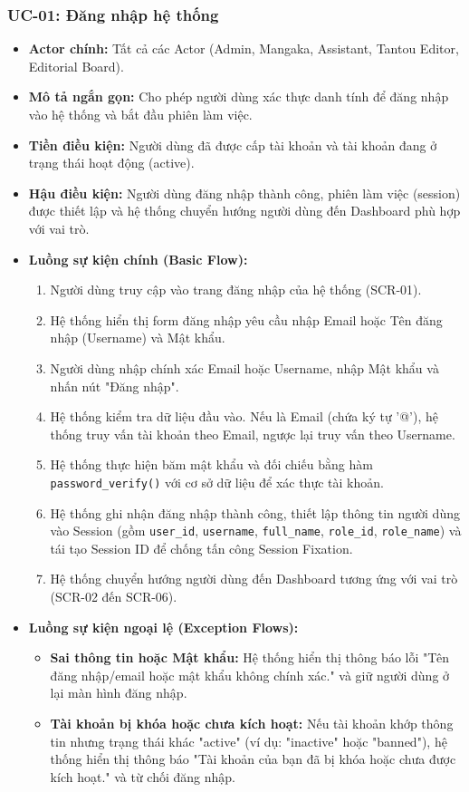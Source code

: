 \subsubsection{UC-01: Đăng nhập hệ thống}
\label{subsubsec:uc01_login}
\begin{itemize}
    \item \textbf{Actor chính:} Tất cả các Actor (Admin, Mangaka, Assistant, Tantou Editor, Editorial Board).
    \item \textbf{Mô tả ngắn gọn:} Cho phép người dùng xác thực danh tính để đăng nhập vào hệ thống và bắt đầu phiên làm việc.
    \item \textbf{Tiền điều kiện:} Người dùng đã được cấp tài khoản và tài khoản đang ở trạng thái hoạt động (active).
    \item \textbf{Hậu điều kiện:} Người dùng đăng nhập thành công, phiên làm việc (session) được thiết lập và hệ thống chuyển hướng người dùng đến Dashboard phù hợp với vai trò.
    \item \textbf{Luồng sự kiện chính (Basic Flow):}
        \begin{enumerate}
            \item Người dùng truy cập vào trang đăng nhập của hệ thống (SCR-01).
            \item Hệ thống hiển thị form đăng nhập yêu cầu nhập Email hoặc Tên đăng nhập (Username) và Mật khẩu.
            \item Người dùng nhập chính xác Email hoặc Username, nhập Mật khẩu và nhấn nút "Đăng nhập".
            \item Hệ thống kiểm tra dữ liệu đầu vào. Nếu là Email (chứa ký tự '@'), hệ thống truy vấn tài khoản theo Email, ngược lại truy vấn theo Username.
            \item Hệ thống thực hiện băm mật khẩu và đối chiếu bằng hàm \texttt{password\_\allowbreak verify()} với cơ sở dữ liệu để xác thực tài khoản.
            \item Hệ thống ghi nhận đăng nhập thành công, thiết lập thông tin người dùng vào Session (gồm \texttt{user\_id}, \texttt{username}, \texttt{full\_name}, \texttt{role\_id}, \texttt{role\_name}) và tái tạo Session ID để chống tấn công Session Fixation.
            \item Hệ thống chuyển hướng người dùng đến Dashboard tương ứng với vai trò (SCR-02 đến SCR-06).
        \end{enumerate}
    \item \textbf{Luồng sự kiện ngoại lệ (Exception Flows):}
        \begin{itemize}
            \item \textbf{Sai thông tin hoặc Mật khẩu:} Hệ thống hiển thị thông báo lỗi "Tên đăng nhập/email hoặc mật khẩu không chính xác." và giữ người dùng ở lại màn hình đăng nhập.
            \item \textbf{Tài khoản bị khóa hoặc chưa kích hoạt:} Nếu tài khoản khớp thông tin nhưng trạng thái khác "active" (ví dụ: "inactive" hoặc "banned"), hệ thống hiển thị thông báo "Tài khoản của bạn đã bị khóa hoặc chưa được kích hoạt." và từ chối đăng nhập.
        \end{itemize}
\end{itemize}

